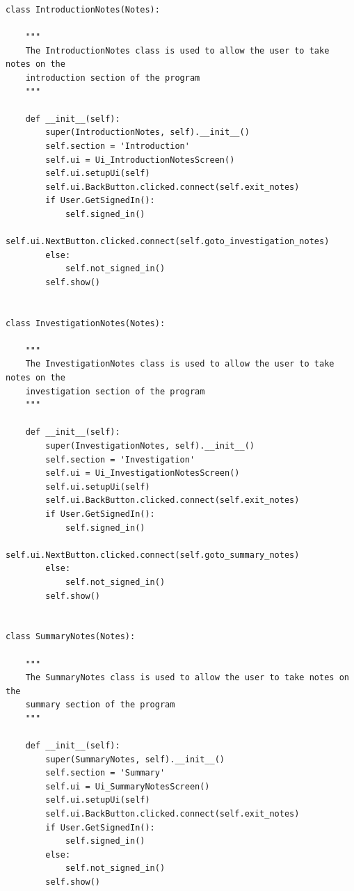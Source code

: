 \documentclass{article}
\begin{document}
\begin{lstlisting}
class IntroductionNotes(Notes):

    """
    The IntroductionNotes class is used to allow the user to take notes on the
    introduction section of the program
    """

    def __init__(self):
        super(IntroductionNotes, self).__init__()
        self.section = 'Introduction'
        self.ui = Ui_IntroductionNotesScreen()
        self.ui.setupUi(self)
        self.ui.BackButton.clicked.connect(self.exit_notes)
        if User.GetSignedIn():
            self.signed_in()
            self.ui.NextButton.clicked.connect(self.goto_investigation_notes)
        else:
            self.not_signed_in()
        self.show()


class InvestigationNotes(Notes):

    """
    The InvestigationNotes class is used to allow the user to take notes on the
    investigation section of the program
    """

    def __init__(self):
        super(InvestigationNotes, self).__init__()
        self.section = 'Investigation'
        self.ui = Ui_InvestigationNotesScreen()
        self.ui.setupUi(self)
        self.ui.BackButton.clicked.connect(self.exit_notes)
        if User.GetSignedIn():
            self.signed_in()
            self.ui.NextButton.clicked.connect(self.goto_summary_notes)
        else:
            self.not_signed_in()
        self.show()


class SummaryNotes(Notes):

    """
    The SummaryNotes class is used to allow the user to take notes on the
    summary section of the program
    """

    def __init__(self):
        super(SummaryNotes, self).__init__()
        self.section = 'Summary'
        self.ui = Ui_SummaryNotesScreen()
        self.ui.setupUi(self)
        self.ui.BackButton.clicked.connect(self.exit_notes)
        if User.GetSignedIn():
            self.signed_in()
        else:
            self.not_signed_in()
        self.show()
\end{lstlisting}
\end{document}
